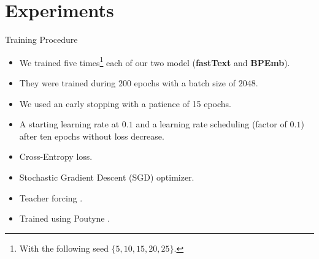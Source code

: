 \documentclass{beamer}
\begin{document}
	\section{Experiments}
	\begin{frame}{Training Procedure}
		\begin{itemize}
			\item<1-> We trained five times\footnote{With the following seed $\{5, 10, 15, 20, 25\}$.} each of our two model (\textbf{fastText} and \textbf{BPEmb}).
			\item<2-> They were trained during $200$ epochs with a batch size of $2048$.
			\item<3-> We used an early stopping with a patience of 15 epochs.
			\item<4-> A starting learning rate at $0.1$ and a learning rate scheduling (factor of $0.1$) after ten epochs without loss decrease. 
			\item<5-> Cross-Entropy loss.
			\item<6-> Stochastic Gradient Descent (SGD) optimizer.
			\item<7-> Teacher forcing \cite{6795228}.
			\item<8-> Trained using Poutyne \cite{poutyne}. 
		\end{itemize}
	\end{frame}
	
\end{document}

